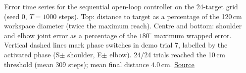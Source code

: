 Error time series for the sequential open-loop controller on the 24-target grid (seed 0, $T=1000$ steps). Top: distance to target as a percentage of the 120\,cm workspace diameter (twice the maximum reach). Centre and bottom: shoulder and elbow joint error as a percentage of the $180^\circ$ maximum wrapped error. Vertical dashed lines mark phase switches in demo trial 7, labelled by the activated phase (S$\pm$ shoulder, E$\pm$ elbow). 24/24 trials reached the 10\,cm threshold (mean $309$ steps); mean final distance $4.0$\,cm. \href{https://github.com/tahmidazam/gg4/blob/main/notebooks/cartesian_control_errors/cartesian_control_errors.ipynb}{\underline{Source}}%